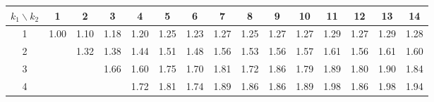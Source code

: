 \documentclass[a3paper,extrafontsizes,20pt, ngerman]{memoir}
\begin{document}
\begin{figure}
    \begin{tabular}{c|cccccccccccccc}
        $k_1 \backslash k_2$ & 1                                & 2                                & 3                                & 4                                & 5                                & 6                                & 7                                & 8                                & 9                                & 10                               & 11                               & 12                               & 13                               & 14                               \\
        \hline
        1                    & \textcolor[HTML]{ 0020ff }{1.00} & \textcolor[HTML]{ 0b20f3 }{1.10} & \textcolor[HTML]{ 1520e9 }{1.18} & \textcolor[HTML]{ 1720e7 }{1.20} & \textcolor[HTML]{ 1d20e1 }{1.25} & \textcolor[HTML]{ 1b20e3 }{1.23} & \textcolor[HTML]{ 1f20df }{1.27} & \textcolor[HTML]{ 1d20e1 }{1.25} & \textcolor[HTML]{ 2020de }{1.27} & \textcolor[HTML]{ 2020de }{1.27} & \textcolor[HTML]{ 2220dc }{1.29} & \textcolor[HTML]{ 2020de }{1.27} & \textcolor[HTML]{ 2220dc }{1.29} & \textcolor[HTML]{ 2120dd }{1.28} \\
        2                    &                                  & \textcolor[HTML]{ 2520d9 }{1.32} & \textcolor[HTML]{ 2c20d2 }{1.38} & \textcolor[HTML]{ 3320cb }{1.44} & \textcolor[HTML]{ 3c20c2 }{1.51} & \textcolor[HTML]{ 3820c6 }{1.48} & \textcolor[HTML]{ 4120bd }{1.56} & \textcolor[HTML]{ 3f20bf }{1.53} & \textcolor[HTML]{ 4120bd }{1.56} & \textcolor[HTML]{ 4320bb }{1.57} & \textcolor[HTML]{ 4720b7 }{1.61} & \textcolor[HTML]{ 4120bd }{1.56} & \textcolor[HTML]{ 4720b7 }{1.61} & \textcolor[HTML]{ 4620b8 }{1.60} \\
        3                    &                                  &                                  & \textcolor[HTML]{ 4d20b1 }{1.66} & \textcolor[HTML]{ 4720b7 }{1.60} & \textcolor[HTML]{ 5820a6 }{1.75} & \textcolor[HTML]{ 5220ac }{1.70} & \textcolor[HTML]{ 5f209f }{1.81} & \textcolor[HTML]{ 5520a9 }{1.72} & \textcolor[HTML]{ 652099 }{1.86} & \textcolor[HTML]{ 5d20a1 }{1.79} & \textcolor[HTML]{ 692095 }{1.89} & \textcolor[HTML]{ 5e20a0 }{1.80} & \textcolor[HTML]{ 6a2094 }{1.90} & \textcolor[HTML]{ 63209b }{1.84} \\
        4                    &                                  &                                  &                                  & \textcolor[HTML]{ 5520a9 }{1.72} & \textcolor[HTML]{ 5f209f }{1.81} & \textcolor[HTML]{ 5620a8 }{1.74} & \textcolor[HTML]{ 692095 }{1.89} & \textcolor[HTML]{ 652099 }{1.86} & \textcolor[HTML]{ 652099 }{1.86} & \textcolor[HTML]{ 692095 }{1.89} & \textcolor[HTML]{ 73208b }{1.98} & \textcolor[HTML]{ 652099 }{1.86} & \textcolor[HTML]{ 74208a }{1.98} & \textcolor[HTML]{ 6f208f }{1.94} \\

\end{tabular}
\end{figure}
\end{document}

